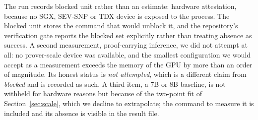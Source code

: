The run records \RunBlocked{} blocked unit rather than an estimate: hardware
attestation, because no SGX, SEV-SNP or TDX device is exposed to the process. The
blocked unit stores the command that would unblock it, and the repository's
verification gate reports the blocked set explicitly rather than treating absence
as success. A second measurement, proof-carrying inference, we did not attempt at
all: no prover-scale device was available, and the smallest configuration we would
accept as a measurement exceeds the memory of the GPU by more than an order of
magnitude. Its honest status is \emph{not attempted}, which is a different claim
from \emph{blocked} and is recorded as such. A third item, a $7$B or $8$B baseline,
is not withheld for hardware reasons but because of the two-point fit of
Section~\ref{sec:scale}, which we decline to extrapolate; the command to measure it
is included and its absence is visible in the result file.
